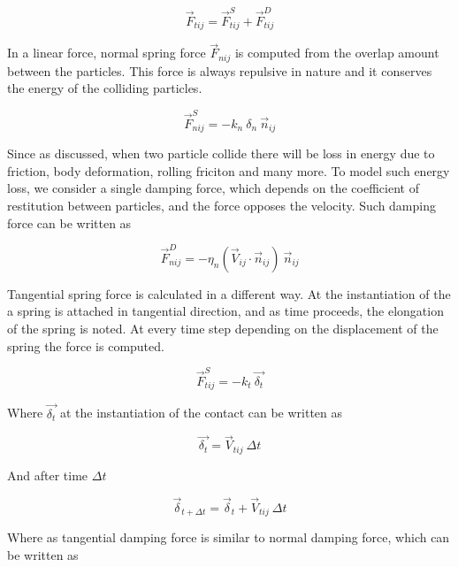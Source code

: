 \begin{equation}
  \label{eq:tang_force}
  \vec{F}_{tij} =  \vec{F}_{tij}^S +  \vec{F}_{tij}^D
\end{equation}

In a linear force, normal spring force $\vec{F}_{nij}$ is computed from the overlap
amount between the particles. This force is always repulsive in nature
and it conserves the energy of the colliding particles.

\begin{equation}
  \label{eq:normal_spring_force}
  \vec{F}_{nij}^S = -k_n \> \delta_n \> \vec{n}_{ij}
\end{equation}

Since as discussed, when two particle collide there will be loss in
energy due to friction, body deformation, rolling friciton and many
more. To model such energy loss, we consider a single damping force,
which depends on the coefficient of restitution between particles, and
the force opposes the velocity. Such damping force can be written as

\begin{equation}
  \label{eq:normal_damping_force}
  \vec{F}_{nij}^D = -\eta_n  (\vec{V}_{ij} \cdot \vec{n}_{ij}) \> \vec{n}_{ij}
\end{equation}


Tangential spring force is calculated in a different way. At the
instantiation of the a spring is attached in tangential direction, and
as time proceeds, the elongation of the spring is noted. At every time
step depending on the displacement of the spring the force is
computed.

\begin{equation}
  \label{eq:tang_spring_force}
  \vec{F}_{tij}^S = -k_t \> \vec{\delta_t}
\end{equation}

Where $ \vec{\delta_t} $ at the instantiation of the contact
can be written as

\begin{equation}
  \label{eq:tang_disp}
 \vec{\delta_t} = \vec{V}_{tij} \> \Delta t
\end{equation}

And after time $\Delta t$

\begin{equation}
  \label{eq:tang_disp}
 \vec{\delta}_{t + \Delta t} = \vec{\delta}_{t} + \vec{V}_{tij} \> \Delta t
\end{equation}

Where as tangential damping force is similar to normal damping force, which can be
written as


